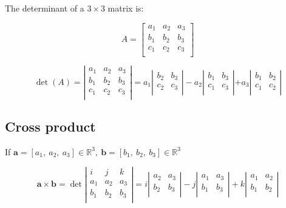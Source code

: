 \documentclass[12pt]{article}
\theoremstyle{plain}
\theoremstyle{remark}
\theoremstyle{definition}
\begin{document}
The determinant of a \(3 \times 3\) matrix is:

\[A = \begin{bmatrix}
a_{1} & a_{2} & a_{3} \\
b_{1} & b_{2} & b_{3} \\
c_{1} & c_{2} & c_{3} \\
\end{bmatrix}\]

\[{\det(A) = \left| \begin{matrix}
a_{1} & a_{2} & a_{3} \\
b_{1} & b_{2} & b_{3} \\
c_{1} & c_{2} & c_{3} \\
\end{matrix} \right| }{= a_{1}\left| \begin{matrix}
b_{2} & b_{3} \\
c_{2} & c_{3} \\
\end{matrix} \right| - a_{2}\left| \begin{matrix}
b_{1} & b_{3} \\
c_{1} & c_{3} \\
\end{matrix} \right| }{+ a_{3}\left| \begin{matrix}
b_{1} & b_{2} \\
c_{1} & c_{2} \\
\end{matrix} \right|} \]


\subsection{Cross product}

If
\(\mathbf{a} = \left\lbrack a_{1},\ a_{2},\ a_{3} \right\rbrack \in \mathbb{R}^{3},\ \mathbf{b} = \left\lbrack b_{1},\ b_{2},\ b_{3} \right\rbrack \in \mathbb{R}^{3}\)

\[\mathbf{a} \times \mathbf{b} = \det\left| \begin{matrix}
i & j & k \\
a_{1} & a_{2} & a_{3} \\
b_{1} & b_{2} & b_{3} \\
\end{matrix} \right| = i\left| \begin{matrix}
a_{2} & a_{3} \\
b_{2} & b_{3} \\
\end{matrix} \right| - j\left| \begin{matrix}
a_{1} & a_{3} \\
b_{1} & b_{3} \\
\end{matrix} \right| + k\left| \begin{matrix}
a_{1} & a_{2} \\
b_{1} & b_{2} \\
\end{matrix} \right|\]
\end{document}
